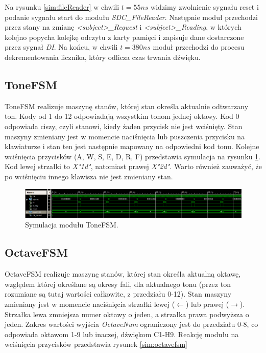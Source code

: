 \documentclass[12pt]{article}
\begin{document}
Na rysunku \ref{sim:fileReader} w chwili $t=55ns$ widzimy zwolnienie sygnału reset i podanie sygnału start do modułu \textit{SDC\_FileReader}. Następnie moduł przechodzi przez stany na zmianę \textit{<subject>\_Request} i \textit{<subject>\_Reading}, w których kolejno popycha kolejkę odczytu z karty pamięci i zapisuje dane dostarczone przez sygnał \textit{DI}. Na końcu, w chwili $t=380ns$ moduł przechodzi do procesu dekrementowania licznika, który odlicza czas trwania dźwięku.


\subsection{ToneFSM}
ToneFSM realizuje maszynę stanów, której stan określa aktualnie odtwarzany ton.
Kody od 1 do 12 odpowiadają wszystkim tonom jednej oktawy. Kod 0 odpowiada ciszy, czyli stanowi, kiedy żaden przycisk nie jest wciśnięty. Stan maszyny zmieniany jest w momencie naciśnięcia lub puszczenia przycisku na klawiaturze i stan ten jest następnie mapowany na odpowiedni kod tonu. Kolejne wciśnięcia przycisków (A, W, S, E, D, R, F) przedstawia symulacja na rysunku \ref{sim:tone}. Kod lewej strzałki to \textit{X"1d"}, natomiast prawej \textit{X"2d"}. Warto również zauważyć, że po wciśnięciu innego klawisza nie jest zmieniany stan.

\begin{figure}[h]
  \centering
  \includegraphics[decodearray={1 0 1 0 1 0}, width=\linewidth]{images/tone}
  \caption{Symulacja modułu ToneFSM.}
  \label{sim:tone}
\end{figure}


\subsection{OctaveFSM}

OctaveFSM realizuje maszynę stanów, której stan określa aktualną oktawę, względem której określane są okresy fali, dla aktualnego tonu (przez ton rozumiane są tutaj wartości całkowite, z przedziału 0-12). Stan maszyny zmieniany jest w momencie naciśnięcia strzałki lewej ($\leftarrow$) lub prawej ($\rightarrow$). Strzałka lewa zmniejsza numer oktawy o jeden, a strzałka prawa podwyższa o jeden. Zakres wartości wyjścia \textit{OctaveNum} ograniczony jest do przedziału 0-8, co odpowiada oktawom 1-9 lub inaczej, dźwiękom C1-H9. Reakcję modułu na wciśnięcia przycisków przedstawia rysunek \ref{sim:octavefsm}
\end{document}

